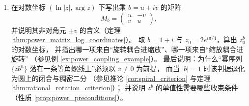 \begin{enumerate}[leftmargin=3em, label=\textbf{题 \arabic*}]
    \item 在对数坐标 $(\ln|z|,\arg z)$ 下写出乘 $b=u+iv$ 的矩阵
    \[
    M_b=\begin{pmatrix}u&-v\\ v&u\end{pmatrix},
    \]
    并说明其非对角元 $\pm v$ 的含义（定理 \ref{thm:power_matrix_log_coordinates}）。
    取 $b=1+i$ 与 $z_0=2e^{i\pi/4}$，算出 $z_0^{b}$ 的对数坐标，
    并指出哪一项来自“旋转耦合进缩放”、哪一项来自“缩放耦合进旋转”
    （参见例 \ref{ex:power_coupling_example}）。
    最后说明：为什么“幂序列 $\{z b^n\}$ 落在一条等角螺线上”必须以 $v\neq0$ 为前提，
    而当 $|b|=1$ 时该判据退化为圆上的闭合与稠密二分
    （参见推论 \ref{cor:spiral_criterion} 与定理 \ref{thm:rational_rotation_criterion}）；
    并说明 $z^b$ 的单值性需要哪些收束条件（性质 \ref{prop:power_preconditions}）。
\end{enumerate}

